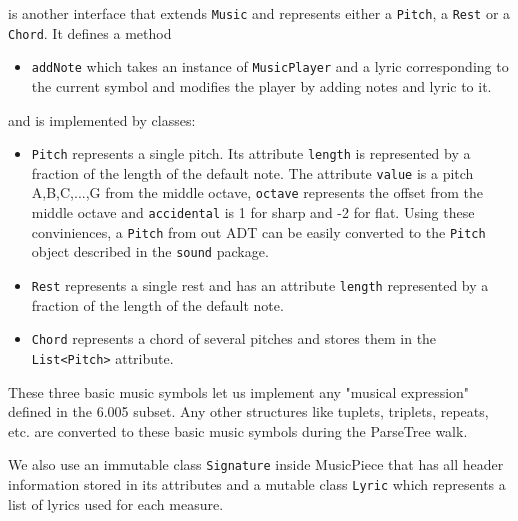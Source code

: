 \documentclass[12pt]{book}
\begin{document}
 is another interface that extends {\tt Music} and represents either a {\tt Pitch}, a {\tt Rest} or a {\tt Chord}. It defines a method
\begin{itemize} 
\item { \tt addNote} which takes an instance of  {\tt MusicPlayer} and a lyric corresponding to the current symbol and modifies the player by adding notes and lyric to it. 
\end{itemize}
\noindent and is implemented by classes:
\begin{itemize} 
\item { \tt Pitch} represents a single pitch. Its attribute {\tt length} is represented by a fraction  of the length of the default note. The attribute {\tt value} is a pitch A,B,C,...,G from the middle octave,  {\tt octave} represents the offset from the middle octave and  {\tt accidental} is 1 for sharp and -2 for flat. Using these conviniences,  a {\tt Pitch} from out ADT can be easily converted to the {\tt Pitch} object described in the {\tt sound} package.
\item { \tt Rest} represents a single rest and has an attribute {\tt length}  represented by a fraction of the length of the default note. 
\item {\tt Chord} represents a chord of several pitches and stores them in the {\tt List<Pitch>} attribute.
\end{itemize}

These three basic music symbols let us implement any "musical expression" defined in the 6.005 subset. Any other structures like tuplets, triplets, repeats, etc. are converted to these basic music symbols during the ParseTree walk.  

We also use an immutable class {\tt Signature} inside MusicPiece that has all header information stored in its attributes and a mutable class {\tt Lyric} which represents a list of lyrics used for each measure.
\end{document}
